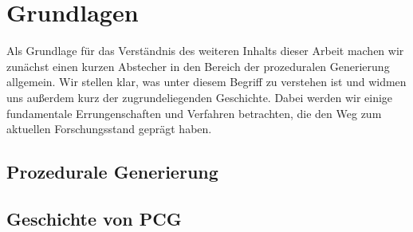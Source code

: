 %
%
%
%
%
%
%
%
%
%
%
%
%

\chapter{Grundlagen}
Als Grundlage für das Verständnis des weiteren Inhalts dieser Arbeit machen wir zunächst einen kurzen Abstecher in den
Bereich der prozeduralen Generierung allgemein. Wir stellen klar, was unter diesem Begriff zu verstehen ist und widmen
uns außerdem kurz der zugrundeliegenden Geschichte. Dabei werden wir einige fundamentale Errungenschaften und Verfahren
betrachten, die den Weg zum aktuellen Forschungsstand geprägt haben.

\section{Prozedurale Generierung}
%
%
%

\section{Geschichte von PCG}
